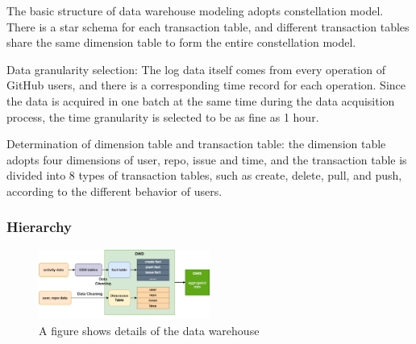 The basic structure of data warehouse modeling adopts constellation model. There is a star schema for each transaction table, and different transaction tables share the same dimension table to form the entire constellation model.

Data granularity selection: The log data itself comes from every operation of GitHub users, and there is a corresponding time record for each operation. Since the data is acquired in one batch at the same time during the data acquisition process, the time granularity is selected to be as fine as 1 hour.

Determination of dimension table and transaction table: the dimension table adopts four dimensions of user, repo, issue and time, and the transaction table is divided into 8 types of transaction tables, such as create, delete, pull, and push, according to the different behavior of users.




\subsubsection{Hierarchy}


\begin{figure}[H]
    \centering
    \includegraphics[width=0.5\textwidth]{./pic/warehouse.png}
    \caption{A figure shows details of the data warehouse}
    \label{fig:}
\end{figure}

